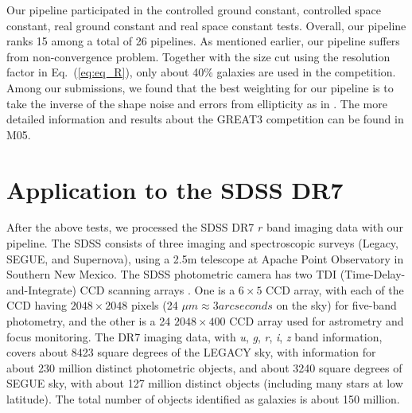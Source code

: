 \documentclass[apj]{emulateapj}
\begin{document}
Our pipeline participated in the  controlled ground constant, controlled space
constant, real ground constant and real space constant
tests. Overall, our pipeline ranks 15 among a total of 26 pipelines. 
As mentioned earlier, our pipeline suffers from non-convergence 
problem. Together with the size cut using the resolution factor in 
Eq.~(\ref{eq:eq_R}), only about 40\% galaxies are used in 
the competition.  Among our submissions, we found
that the best weighting for our pipeline is to take the inverse of
the shape noise and errors from ellipticity as in \citet[herefater
M05]{Mandelbaum2015}.  The more detailed
information and results about the GREAT3 competition can be found in
 M05.

\section{Application to the SDSS DR7}
\label{sec_application}

After the above tests, we processed the SDSS DR7 \citep{Abazajian2009}
$r$ band imaging data with our pipeline.  The SDSS \citep{York2000} 
consists of three imaging and spectroscopic surveys 
(Legacy, SEGUE, and Supernova), using a 2.5m telescope at Apache 
Point Observatory in Southern New Mexico. The SDSS
photometric camera has two TDI (Time-Delay-and-Integrate) CCD scanning
arrays \citep{Gunn1998}.  One is a $6\times 5$ CCD array, with each of
the CCD having $2048\times 2048$ pixels (24 $\mu m \approx 3 arcseconds$ 
on the sky) for five-band photometry, and the other is a 24 $2048\times
400$ CCD array used for astrometry and focus monitoring. The DR7
imaging data, with \textit{u}, \textit{g}, \textit{r}, \textit{i},
\textit{z} band information,  covers about 8423 square degrees 
of the LEGACY sky, with information for about 230 million distinct 
photometric objects, and about 3240 square degrees of SEGUE sky, 
with about 127 million distinct objects (including many stars at low
latitude). The total number of objects identified as galaxies is 
about 150 million.
\end{document}
